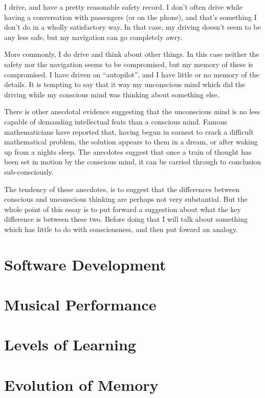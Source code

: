 \documentclass[10pt,titlepage]{book}
\begin{document}
I drive, and have a pretty reasonable safety record.
I don't often drive while having a conversation with passengers (or on the phone), and that's something I don't do in a wholly satisfactory way.
In that case, my driving doesn't seem to be any less safe, but my navigation can go completely awry.

More commonly, I do drive and think about other things.
In this case neither the safety nor the navigation seems to be compromised, but my memory of these is compromised.
I have driven on ``autopilot'', and I have little or no memory of the details.
It is tempting to say that it way my unconscious mind which did the driving while my conscious mind was thinking about something else.

There is other anecdotal evidence suggesting that the unconscious mind is no less capable of demanding intellectual feats than a conscious mind.
Famous mathematicians have reported that, having begun in earnest to crack a difficult mathematical problem, the solution appears to them in a dream, or after waking up from a nights sleep.
The anecdotes suggest that once a train of thought has been set in motion by the conscious mind, it can be carried through to conclusion sub-consciously.

The tendency of these anecdotes, is to suggest that the differences between conscious and unconscious thinking are perhaps not very substantial.
But the whole point of this essay is to put forward a suggestion about what the key difference is between these two.
Before doing that I will talk about something which has little to do with consciousness, and then put foward an analogy.

\section{Software Development}

\section{Musical Performance}

\section{Levels of Learning}

\section{Evolution of Memory}
\end{document}
